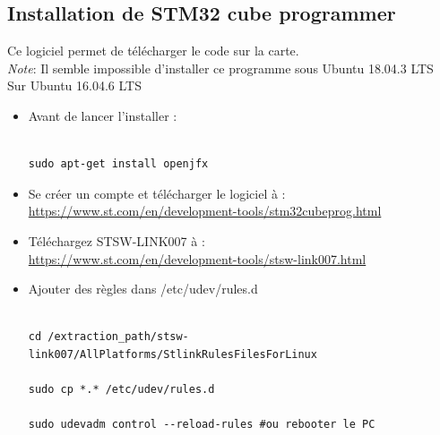 \documentclass{article}
\begin{document}
\subsection{Installation de STM32 cube programmer}
Ce logiciel permet de télécharger le code sur la carte. \\
\textit{Note}: Il semble impossible d'installer ce programme sous Ubuntu 18.04.3 LTS \\
Sur Ubuntu 16.04.6 LTS
\begin{itemize}
   
\begin{itemize}
   



 \item Avant de lancer l'installer :
\begin{verbatim}

sudo apt-get install openjfx

\end{verbatim}

 \item Se créer un compte et télécharger le logiciel à : \\

\url{https://www.st.com/en/development-tools/stm32cubeprog.html}

\item Téléchargez STSW-LINK007 à : \\ 
\url{https://www.st.com/en/development-tools/stsw-link007.html}


\item Ajouter des règles dans /etc/udev/rules.d

\begin{verbatim}

cd /extraction_path/stsw-link007/AllPlatforms/StlinkRulesFilesForLinux

sudo cp *.* /etc/udev/rules.d

sudo udevadm control --reload-rules #ou rebooter le PC


\end{verbatim}

\end{itemize}


\end{itemize}
\end{document}
